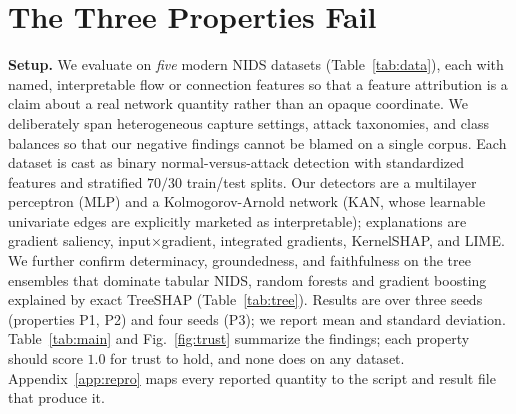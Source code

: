 \documentclass[conference]{IEEEtran}
\begin{document}
\section{The Three Properties Fail}\label{sec:fail}
\textbf{Setup.} We evaluate on \emph{five} modern NIDS datasets (Table~\ref{tab:data}), each with
named, interpretable flow or connection features so that a feature attribution is a claim about a
real network quantity rather than an opaque coordinate. We deliberately span heterogeneous
capture settings, attack taxonomies, and class balances so that our negative findings cannot be
blamed on a single corpus. Each dataset is cast as binary normal-versus-attack detection with
standardized features and stratified $70/30$ train/test splits. Our detectors are a multilayer
perceptron (MLP) and a Kolmogorov-Arnold network (KAN, whose learnable univariate edges are
explicitly marketed as interpretable); explanations are gradient saliency, input$\times$gradient,
integrated gradients, KernelSHAP, and LIME. We further confirm determinacy, groundedness, and
faithfulness on the tree ensembles that dominate tabular NIDS, random forests and gradient
boosting explained by exact TreeSHAP (Table~\ref{tab:tree}). Results are over three seeds (properties P1, P2) and
four seeds (P3); we report mean and standard deviation. Table~\ref{tab:main} and
Fig.~\ref{fig:trust} summarize the findings; each property should score $1.0$ for trust to hold,
and none does on any dataset. Appendix~\ref{app:repro} maps every reported quantity to the script
and result file that produce it.
\end{document}
